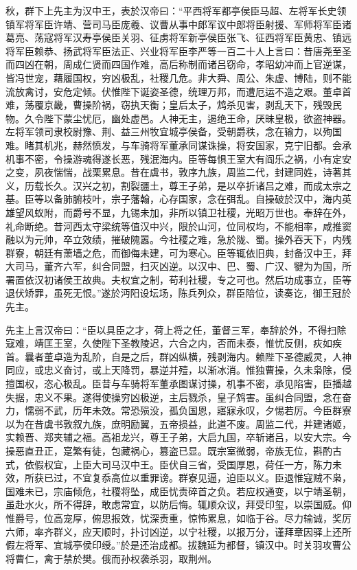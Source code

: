 \documentclass[12pt,UTF8]{ctexbook}
\begin{document}
秋，群下上先主为汉中王，表於汉帝曰：“平西将军都亭侯臣马超、左将军长史领镇军将军臣许靖、营司马臣庞羲、议曹从事中郎军议中郎将臣射援、军师将军臣诸葛亮、荡寇将军汉寿亭侯臣关羽、征虏将军新亭侯臣张飞、征西将军臣黄忠、镇远将军臣赖恭、扬武将军臣法正、兴业将军臣李严等一百二十人上言曰：昔唐尧至圣而四凶在朝，周成仁贤而四国作难，高后称制而诸吕窃命，孝昭幼冲而上官逆谋，皆冯世宠，藉履国权，穷凶极乱，社稷几危。非大舜、周公、朱虚、博陆，则不能流放禽讨，安危定倾。伏惟陛下诞姿圣德，统理万邦，而遭厄运不造之艰。董卓首难，荡覆京畿，曹操阶祸，窃执天衡；皇后太子，鸩杀见害，剥乱天下，残毁民物。久令陛下蒙尘忧厄，幽处虚邑。人神无主，遏绝王命，厌昧皇极，欲盗神器。左将军领司隶校尉豫、荆、益三州牧宜城亭侯备，受朝爵秩，念在输力，以殉国难。睹其机兆，赫然愤发，与车骑将军董承同谋诛操，将安国家，克宁旧都。会承机事不密，令操游魂得遂长恶，残泯海内。臣等每惧王室大有阎乐之祸，小有定安之变，夙夜惴惴，战栗累息。昔在虞书，敦序九族，周监二代，封建同姓，诗著其义，历载长久。汉兴之初，割裂疆土，尊王子弟，是以卒折诸吕之难，而成太宗之基。臣等以备肺腑枝叶，宗子藩翰，心存国家，念在弭乱。自操破於汉中，海内英雄望风蚁附，而爵号不显，九锡未加，非所以镇卫社稷，光昭万世也。奉辞在外，礼命断绝。昔河西太守梁统等值汉中兴，限於山河，位同权均，不能相率，咸推窦融以为元帅，卒立效绩，摧破隗嚣。今社稷之难，急於陇、蜀。操外吞天下，内残群寮，朝廷有萧墙之危，而御侮未建，可为寒心。臣等辄依旧典，封备汉中王，拜大司马，董齐六军，纠合同盟，扫灭凶逆。以汉中、巴、蜀、广汉、犍为为国，所署置依汉初诸侯王故典。夫权宜之制，苟利社稷，专之可也。然后功成事立，臣等退伏矫罪，虽死无恨。”遂於沔阳设坛场，陈兵列众，群臣陪位，读奏讫，御王冠於先主。

先主上言汉帝曰：“臣以具臣之才，荷上将之任，董督三军，奉辞於外，不得扫除寇难，靖匡王室，久使陛下圣教陵迟，六合之内，否而未泰，惟忧反侧，疢如疾首。曩者董卓造为乱阶，自是之后，群凶纵横，残剥海内。赖陛下圣德威灵，人神同应，或忠义奋讨，或上天降罚，暴逆并殪，以渐冰消。惟独曹操，久未枭除，侵擅国权，恣心极乱。臣昔与车骑将军董承图谋讨操，机事不密，承见陷害，臣播越失据，忠义不果。遂得使操穷凶极逆，主后戮杀，皇子鸩害。虽纠合同盟，念在奋力，懦弱不武，历年未效。常恐殒没，孤负国恩，寤寐永叹，夕惕若厉。今臣群寮以为在昔虞书敦叙九族，庶明励翼，五帝损益，此道不废。周监二代，并建诸姬，实赖晋、郑夹辅之福。高祖龙兴，尊王子弟，大启九国，卒斩诸吕，以安大宗。今操恶直丑正，寔繁有徒，包藏祸心，篡盗已显。既宗室微弱，帝族无位，斟酌古式，依假权宜，上臣大司马汉中王。臣伏自三省，受国厚恩，荷任一方，陈力未效，所获已过，不宜复忝高位以重罪谤。群寮见逼，迫臣以义。臣退惟寇贼不枭，国难未已，宗庙倾危，社稷将坠，成臣忧责碎首之负。若应权通变，以宁靖圣朝，虽赴水火，所不得辞，敢虑常宜，以防后悔。辄顺众议，拜受印玺，以崇国威。仰惟爵号，位高宠厚，俯思报效，忧深责重，惊怖累息，如临于谷。尽力输诚，奖厉六师，率齐群义，应天顺时，扑讨凶逆，以宁社稷，以报万分，谨拜章因驿上还所假左将军、宜城亭侯印绶。”於是还治成都。拔魏延为都督，镇汉中。时关羽攻曹公将曹仁，禽于禁於樊。俄而孙权袭杀羽，取荆州。
\end{document}
